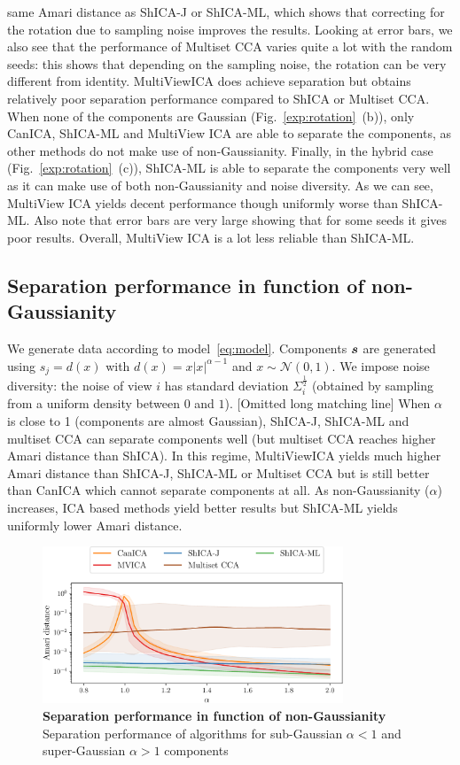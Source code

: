 same Amari distance as ShICA-J or ShICA-ML, which shows that correcting for the
rotation due to sampling noise improves the results. Looking at error bars, we
also see that the performance of Multiset CCA varies quite a lot with the random
seeds: this shows that depending on the sampling noise, the rotation can be very
different from identity. MultiViewICA does achieve separation but obtains
relatively poor separation performance compared to ShICA or Multiset CCA.
When none of the components are Gaussian (Fig.~\ref{exp:rotation}~(b)), only
CanICA, ShICA-ML and MultiView ICA are able to separate the components, as other methods do not make use of non-Gaussianity.
Finally, in the hybrid case (Fig.~\ref{exp:rotation}~(c)), ShICA-ML is able to
separate the components very well as it can make use of both non-Gaussianity and
noise diversity. As we can see, MultiView ICA yields decent performance though
uniformly worse than ShICA-ML. Also note that error bars are very large showing
that for some seeds it gives poor results. Overall, MultiView ICA is a lot less
reliable than ShICA-ML.


\subsection{Separation performance in function of non-Gaussianity}
We generate data according to model~\eqref{eq:model}. Components $\boldsymbol{s}$ are
generated using $s_j = d(x)$ with $d(x) = x |x|^{\alpha - 1}$ and $x \sim
\mathcal{N}(0, 1)$. We impose noise diversity: the noise of view $i$ has standard deviation $\Sigma_i^{\frac12}$ (obtained by sampling from a uniform density between $0$ and $1$).
[Omitted long matching line]
 When $\alpha$ is close to 1 (components are almost Gaussian), ShICA-J, ShICA-ML and multiset CCA can separate components well (but multiset CCA reaches higher Amari distance than ShICA). In this regime, MultiViewICA yields much higher Amari distance than ShICA-J, ShICA-ML or Multiset CCA but is still better than CanICA which cannot separate components at all.
 As non-Gaussianity ($\alpha$) increases, ICA based methods yield better results but ShICA-ML yields uniformly lower Amari distance.
\begin{figure}
\centering
  \includegraphics[width=0.8\textwidth]{./figures/amvica/synthetic_Gaussian_source.pdf}
  \caption{\textbf{ Separation performance in function of non-Gaussianity} Separation performance of algorithms for sub-Gaussian $\alpha < 1$ and super-Gaussian $\alpha > 1$ components}
  \label{exp:separatingpower}
\end{figure}

